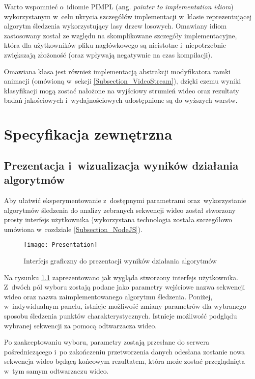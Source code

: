   Warto wspomnieć o~idiomie PIMPL (ang. \textit{pointer to implementation idiom}) wykorzystanym w~celu ukrycia szczegółów implementacji w~klasie reprezentującej algorytm śledzenia wykorzystujący lasy drzew losowych. Omawiany idiom zastosowany został ze względu na skomplikowane szczegóły implementacyjne, która dla użytkowników pliku nagłówkowego są nieistotne i~niepotrzebnie zwiększają złożoność (oraz wpływają negatywnie na czas kompilacji).

  Omawiana klasa jest również implementacją abstrakcji modyfikatora ramki animacji (omówioną w~sekcji \ref{Subsection_VideoStream}), dzięki czemu wyniki klasyfikacji mogą zostać nałożone na wyjściowy strumień wideo oraz rezultaty badań jakościowych i~wydajnościowych udostępnione są do wyższych warstw.

\chapter{Specyfikacja zewnętrzna}\label{Chapter_SpecyfikacjaZewnetrzna}

  \section{Prezentacja i~wizualizacja wyników działania algorytmów}\label{Section_Front}
    Aby ułatwić eksperymentowanie z~dostępnymi parametrami oraz~wykorzystanie algorytmów śledzenia do analizy zebranych sekwencji wideo został stworzony prosty interfejs użytkownika (wykorzystana technologia została szczegółowo umówiona w~rozdziale \ref{Subsection_NodeJS}).

    \begin{figure}[!ht]
      \centering
      \texttt{[image: Presentation]}
      \caption[Interfejs graficzny do prezentacji wyników działania algorytmów]{Interfejs graficzny do prezentacji wyników działania algorytmów}
      \label{fig:AlgorithmsPresentation}
    \end{figure}

    Na rysunku \ref{fig:AlgorithmsPresentation} zaprezentowano jak wygląda stworzony interfejs użytkownika. Z~dwóch pól wyboru zostają podane jako parametry wejściowe nazwa sekwencji wideo oraz nazwa zaimplementowanego algorytmu śledzenia. Poniżej, w~indywidualnym panelu, istnieje możliwość zmiany parametrów dla wybranego sposobu śledzenia punktów charakterystycznych. Istnieje możliwość podglądu wybranej sekwencji za pomocą odtwarzacza wideo.

    Po zaakceptowaniu wyboru, parametry zostają przesłane do serwera pośredniczącego i~po zakończeniu przetworzenia danych odesłana zostanie nowa sekwencja wideo będącą końcowym rezultatem, która może zostać przeglądnięta w~tym samym odtwarzaczu wideo.

